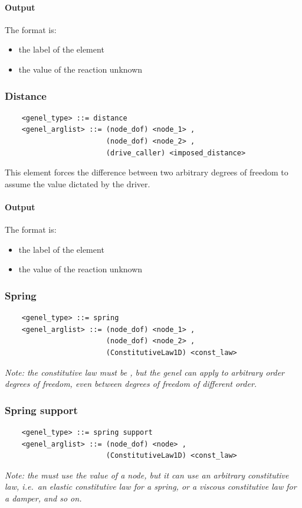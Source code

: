 \paragraph{Output}
The format is:
\begin{itemize}
    \item the label of the element
    \item the value of the reaction unknown
\end{itemize}
  
\subsubsection{Distance}
\begin{verbatim}
    <genel_type> ::= distance
    <genel_arglist> ::= (node_dof) <node_1> ,
                        (node_dof) <node_2> ,
                        (drive_caller) <imposed_distance>
\end{verbatim}
This element forces the difference between two arbitrary degrees of freedom
to assume the value dictated by the driver.

\paragraph{Output}
The format is:
\begin{itemize}
    \item the label of the element
    \item the value of the reaction unknown
\end{itemize}
  
\subsubsection{Spring}
\begin{verbatim}
    <genel_type> ::= spring
    <genel_arglist> ::= (node_dof) <node_1> ,
                        (node_dof) <node_2> ,
                        (ConstitutiveLaw1D) <const_law>
\end{verbatim}
{\em 
    Note: the constitutive law must be , but the 
    genel can apply to arbitrary order degrees of freedom, even between degrees 
    of freedom of different order.
}

\subsubsection{Spring support}
\begin{verbatim}
    <genel_type> ::= spring support
    <genel_arglist> ::= (node_dof) <node> ,                      
                        (ConstitutiveLaw1D) <const_law>
\end{verbatim}
{\em
    Note: the  must use the  value of a 
     node, but it can use an arbitrary constitutive law,
    i.e.\ an elastic constitutive law for a spring, or a viscous
    constitutive law for a damper, and so on.
}

